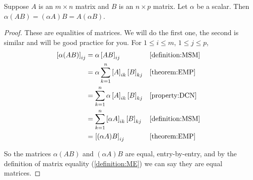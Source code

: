 \documentclass{ximera}
\begin{document}
\begin{theorem}
  \label{theorem:MMSMM}

  Suppose $A$ is an $m\times n$ matrix and $B$ is an $n\times p$ matrix.  Let $\alpha$ be a scalar.  Then $\alpha(AB)=(\alpha A)B=A(\alpha B)$.

  \begin{proof}
    These are equalities of matrices.  We will do the first one, the second is similar and will be good practice for you.    For $1\leq i\leq m$, $1\leq j\leq p$,
    \begin{align*}
      \left\lbrack\alpha(AB)\right\rbrack_{ij}
      &=\alpha\left\lbrack AB\right\rbrack_{ij}&&\ref{definition:MSM}\\
      &=\alpha\sum_{k=1}^{n}\left\lbrack A\right\rbrack_{ik}\left\lbrack B\right\rbrack_{kj}&&\ref{theorem:EMP}\\
      &=\sum_{k=1}^{n}\alpha\left\lbrack A\right\rbrack_{ik}\left\lbrack B\right\rbrack_{kj}&&\ref{property:DCN}\\
      &=\sum_{k=1}^{n}\left\lbrack\alpha A\right\rbrack_{ik}\left\lbrack B\right\rbrack_{kj}&&\ref{definition:MSM}\\
      &=\left\lbrack(\alpha A)B\right\rbrack_{ij}&&\ref{theorem:EMP}
    \end{align*}
    
    So the matrices $\alpha(AB)$ and $(\alpha A)B$ are equal, entry-by-entry, and by the definition of matrix equality (\ref{definition:ME}) we can say they are equal matrices.
    
  \end{proof}
\end{theorem}
\end{document}
